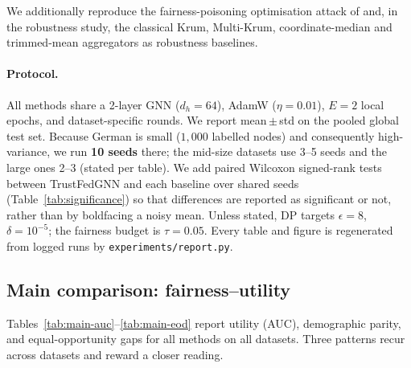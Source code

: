 \documentclass[pdflatex,sn-mathphys-num]{sn-jnl}
\theoremstyle{thmstyleone}%
\theoremstyle{thmstyletwo}%
\theoremstyle{thmstylethree}%
\begin{document}
We additionally reproduce the fairness-poisoning optimisation attack of
\cite{kasyap2025attack} and, in the robustness study, the classical Krum,
Multi-Krum, coordinate-median and trimmed-mean aggregators
\cite{blanchard2017krum,yin2018byzantine} as robustness baselines.

\paragraph{Protocol.}
All methods share a 2-layer GNN ($d_h{=}64$), AdamW ($\eta{=}0.01$), $E{=}2$
local epochs, and dataset-specific rounds. We report mean\,$\pm$\,std on the
pooled global test set. Because German is small ($1{,}000$ labelled nodes) and
consequently high-variance, we run \textbf{10 seeds} there; the mid-size
datasets use 3--5 seeds and the large ones 2--3 (stated per table). We add
paired Wilcoxon signed-rank tests between TrustFedGNN and each baseline over
shared seeds (Table~\ref{tab:significance}) so that differences are reported as
significant or not, rather than by boldfacing a noisy mean. Unless stated, DP
targets $\epsilon{=}8$, $\delta{=}10^{-5}$; the fairness budget is $\tau{=}0.05$.
Every table and figure is regenerated from logged runs by
\texttt{experiments/report.py}.

\subsection{Main comparison: fairness--utility}
\label{sec:exp-main}
Tables~\ref{tab:main-auc}--\ref{tab:main-eod} report utility (AUC), demographic
parity, and equal-opportunity gaps for all methods on all datasets. Three
patterns recur across datasets and reward a closer reading.
\end{document}

